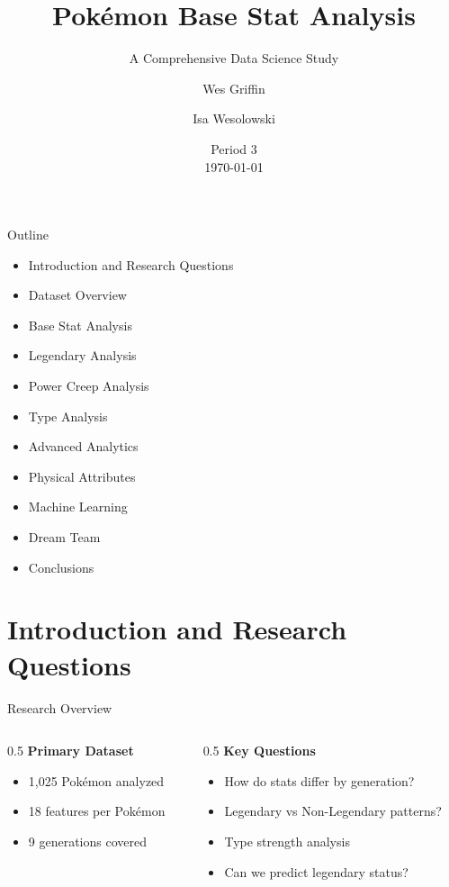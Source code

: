 \documentclass[t,aspectratio=169,12pt]{beamer}
\title{Pokémon Base Stat Analysis}
\subtitle{A Comprehensive Data Science Study}
\author{Wes Griffin \and Isa Wesolowski}
\date{Period 3 \\ \today}
\begin{document}
\begin{frame}
  \titlepage
\end{frame}

\begin{frame}{Outline}
  \begin{itemize}
    \item Introduction and Research Questions
    \item Dataset Overview
    \item Base Stat Analysis
    \item Legendary Analysis
    \item Power Creep Analysis
    \item Type Analysis
    \item Advanced Analytics
    \item Physical Attributes
    \item Machine Learning
    \item Dream Team
    \item Conclusions
  \end{itemize}
\end{frame}

\section{Introduction and Research Questions}

\begin{frame}{Research Overview}
  \begin{columns}
    \begin{column}{0.5\textwidth}
      \textbf{Primary Dataset}
      \begin{itemize}
        \item 1,025 Pokémon analyzed
        \item 18 features per Pokémon
        \item 9 generations covered
      \end{itemize}
    \end{column}
    \begin{column}{0.5\textwidth}
      \textbf{Key Questions}
      \begin{itemize}
        \item How do stats differ by generation?
        \item Legendary vs Non-Legendary patterns?
        \item Type strength analysis
        \item Can we predict legendary status?
      \end{itemize}
    \end{column}
  \end{columns}
\end{frame}
\end{document}
